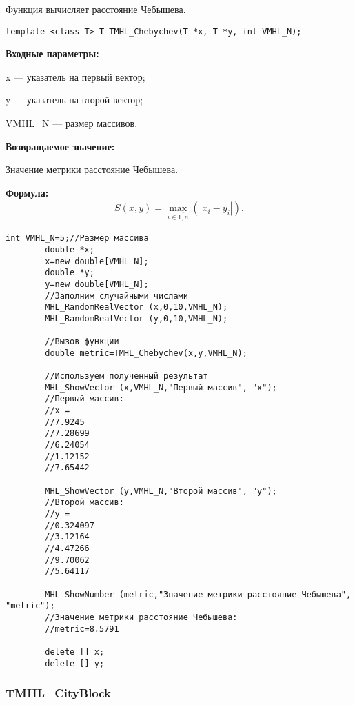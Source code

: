 \documentclass[a4paper,12pt]{article}
\begin{document}
Функция вычисляет расстояние Чебышева.


\begin{lstlisting}[label=code_syntax_TMHL_Chebychev,caption=Синтаксис]
template <class T> T TMHL_Chebychev(T *x, T *y, int VMHL_N);
\end{lstlisting}

\textbf{Входные параметры:}
 
x --- указатель на первый вектор;
 
y --- указатель на второй вектор;
 
VMHL\_N --- размер массивов.

\textbf{Возвращаемое значение:}
 
Значение метрики расстояние Чебышева.

\textbf{Формула:}
\begin{eqnarray*}
S\left( \bar{x}, \bar{y}\right)=\max_{i\in\overline{1,n}}\left( \left|x_i-y_i \right| \right)  .
\end{eqnarray*}


\begin{lstlisting}[label=code_use_TMHL_Chebychev,caption=Пример использования]
        int VMHL_N=5;//Размер массива
        double *x;
        x=new double[VMHL_N];
        double *y;
        y=new double[VMHL_N];
        //Заполним случайными числами
        MHL_RandomRealVector (x,0,10,VMHL_N);
        MHL_RandomRealVector (y,0,10,VMHL_N);

        //Вызов функции
        double metric=TMHL_Chebychev(x,y,VMHL_N);

        //Используем полученный результат
        MHL_ShowVector (x,VMHL_N,"Первый массив", "x");
        //Первый массив:
        //x =	
        //7.9245
        //7.28699
        //6.24054
        //1.12152
        //7.65442

        MHL_ShowVector (y,VMHL_N,"Второй массив", "y");
        //Второй массив:
        //y =	
        //0.324097
        //3.12164
        //4.47266
        //9.70062
        //5.64117

        MHL_ShowNumber (metric,"Значение метрики расстояние Чебышева", "metric");
        //Значение метрики расстояние Чебышева:
        //metric=8.5791

        delete [] x;
        delete [] y;
\end{lstlisting}

\subsubsection{TMHL\_CityBlock}\label{TMHL_CityBlock}
\end{document}
